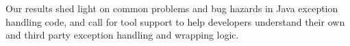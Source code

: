 \documentclass[conference]{IEEEtran}
\begin{document}
Our results shed light on common problems and bug hazards in Java
exception handling code, and call for tool support to help developers
understand their own and third party exception handling and wrapping logic.









\end{document}
